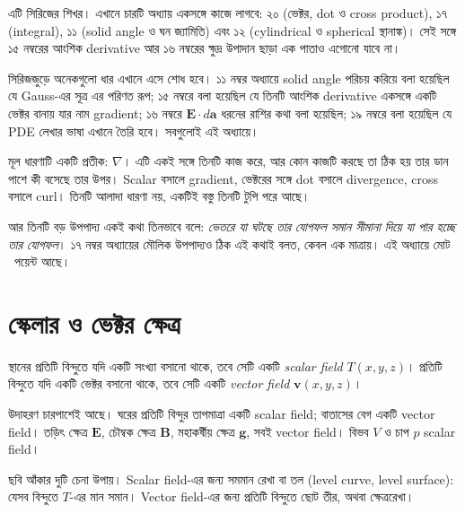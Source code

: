 \documentclass[11pt]{article}
\begin{document}

\noindent
এটি সিরিজের শিখর। এখানে চারটি অধ্যায় একসঙ্গে কাজে লাগবে: ২০ (ভেক্টর,
dot ও cross product), ১৭ (integral), ১১ (solid angle ও ঘন জ্যামিতি) এবং
১২ (cylindrical ও spherical স্থানাঙ্ক)। সেই সঙ্গে ১৫ নম্বরের আংশিক
derivative আর ১৬ নম্বরের ক্ষুদ্র উপাদান ছাড়া এক পাতাও এগোনো যাবে না।

সিরিজজুড়ে অনেকগুলো ধার এখানে এসে শোধ হবে। ১১ নম্বর অধ্যায়ে solid angle
পরিচয় করিয়ে বলা হয়েছিল যে Gauss-এর সূত্র এর পরিণত রূপ; ১৫ নম্বরে বলা
হয়েছিল যে তিনটি আংশিক derivative একসঙ্গে একটি ভেক্টর বানায় যার নাম gradient;
১৬ নম্বরে $\mathbf{E}\cdot d\mathbf{a}$ ধরনের রাশির কথা বলা হয়েছিল;
১৯ নম্বরে বলা হয়েছিল যে PDE লেখার ভাষা এখানে তৈরি হবে। সবগুলোই এই
অধ্যায়ে।

মূল ধারণাটি একটি প্রতীক: $\nabla$। এটি একই সঙ্গে তিনটি কাজ করে, আর কোন কাজটি
করছে তা ঠিক হয় তার ডান পাশে কী বসেছে তার উপর। Scalar বসালে gradient,
ভেক্টরের সঙ্গে dot বসালে divergence, cross বসালে curl। তিনটি আলাদা ধারণা নয়,
একটিই বস্তু তিনটি টুপি পরে আছে।

আর তিনটি বড় উপপাদ্য একই কথা তিনভাবে বলে: \emph{ভেতরে যা ঘটছে তার যোগফল সমান
সীমানা দিয়ে যা পার হচ্ছে তার যোগফল}। ১৭ নম্বর অধ্যায়ের মৌলিক উপপাদ্যও
ঠিক এই কথাই বলত, কেবল এক মাত্রায়। এই অধ্যায়ে মোট \totalpoints\ পয়েন্ট
আছে।

\section{স্কেলার ও ভেক্টর ক্ষেত্র}

\begin{idea}[ক্ষেত্র]
স্থানের প্রতিটি বিন্দুতে যদি একটি সংখ্যা বসানো থাকে, তবে সেটি একটি
\emph{scalar field} $T(x,y,z)$। প্রতিটি বিন্দুতে যদি একটি ভেক্টর বসানো থাকে,
তবে সেটি একটি \emph{vector field}
$\mathbf{v}(x,y,z)$।
\end{idea}

উদাহরণ চারপাশেই আছে। ঘরের প্রতিটি বিন্দুর তাপমাত্রা একটি scalar field; বাতাসের
বেগ একটি vector field। তড়িৎ ক্ষেত্র $\mathbf{E}$, চৌম্বক ক্ষেত্র
$\mathbf{B}$, মহাকর্ষীয় ক্ষেত্র $\mathbf{g}$, সবই vector field। বিভব $V$ ও
চাপ $p$ scalar field।

ছবি আঁকার দুটি চেনা উপায়। Scalar field-এর জন্য সমমান রেখা বা তল (level
curve, level surface): যেসব বিন্দুতে $T$-এর মান সমান। Vector field-এর জন্য
প্রতিটি বিন্দুতে ছোট তীর, অথবা ক্ষেত্ররেখা।
\end{document}
